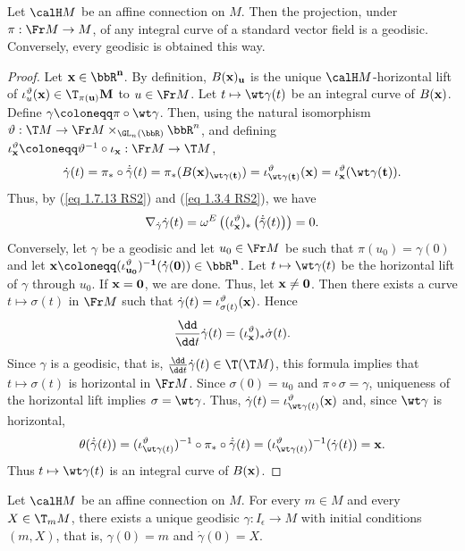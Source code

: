 \begin{prop}[{{\cite[Prop.~2.1.22]{RS2}}}]\label{prop 2.1.22 RS2}
    Let $\calH M$ be an affine connection on $M$. Then the projection, under $\pi:\Fr M\to M$, of any integral curve of a standard vector field is a geodisic. Conversely, every geodisic is obtained this way.
\end{prop}
\begin{proof}
    Let $\bf{x}\in\bbR^n$. By definition, $B(\bf{x})_u$ is the unique $\calH M$-horizontal lift of $\iota_u^\vartheta(\bf{x})\in \T_{\pi(u)}M$ to $u\in\Fr M$. Let $t\mapsto \wt\gamma(t)$ be an integral curve of $B(\bf{x})$. Define $\gamma\coloneqq \pi\circ\wt\gamma$. Then, using the natural isomorphism $\vartheta:\T M\to \Fr M\times_{\GL_n(\bbR)}\bbR^n$, and defining $\iota_{\bf{x}}^\vartheta\coloneqq \vartheta^{-1}\circ\iota_{\bf{x}}:\Fr M\to \T M$,
    \[\dot\gamma(t)=\pi_\ast\circ \dot{\tilde\gamma}(t)=\pi_\ast(B(\bf{x})_{\wt\gamma(t)})=\iota_{\wt\gamma(t)}^\vartheta(\bf{x})=\iota_{\bf{x}}^\vartheta(\wt\gamma(t)).\]
    Thus, by (\ref{eq 1.7.13 RS2}) and (\ref{eq 1.3.4 RS2}), we have 
    \[\nabla_{\dot\gamma}\dot\gamma(t)=\omega^E\left((\iota_{\bf{x}}^\vartheta)_\ast \left(\dot{\tilde\gamma}(t)\right)\right)=0.\]
    Conversely, let $\gamma$ be a geodisic and let $u_0\in\Fr M$ be such that $\pi(u_0)=\gamma(0)$ and let $\bf{x}\coloneqq (\iota_{u_0}^\vartheta)^{-1}(\dot\gamma(0))\in\bbR^n$. Let $t\mapsto \wt\gamma(t)$ be the horizontal lift of $\gamma$ through $u_0$. If $\bf{x}=0$, we are done. Thus, let $\bf{x}\neq 0$. Then there exists a curve $t\mapsto \sigma(t)$ in $\Fr M$ such that $\dot\gamma(t)=\iota_{\sigma(t)}^\vartheta(\bf{x})$. Hence 
    \[\frac{\dd}{\dd t}\dot\gamma(t)=(\iota^\vartheta_{\bf{x}})_\ast\dot\sigma(t).\] 
    Since $\gamma$ is a geodisic, that is, $\frac{\dd}{\dd t}\dot\gamma(t)\in \T(\T M)$, this formula implies that $t\mapsto \sigma(t)$ is horizontal in $\Fr M$. Since $\sigma(0)=u_0$ and $\pi\circ \sigma=\gamma$, uniqueness of the horizontal lift implies $\sigma=\wt\gamma$. Thus, $\dot\gamma(t)=\iota_{\wt\gamma(t)}^\vartheta(\bf{x})$ and, since $\wt\gamma$ is horizontal,
    \[\theta(\dot{\tilde\gamma}(t))=(\iota_{\wt\gamma(t)}^\vartheta)^{-1}\circ\pi_\ast\circ\dot{\tilde\gamma}(t)=
    (\iota_{\wt\gamma(t)}^\vartheta)^{-1}(\dot\gamma(t))=\bf{x}.\]
    Thus $t\mapsto \wt\gamma(t)$ is an integral curve of $B(\bf{x})$.
\end{proof}

\begin{cor}[{{\cite[Cor.~2.1.23]{RS2}}}]\label{cor 2.1.23 RS2}
    Let $\calH M$ be an affine connection on $M$. For every $m\in M$ and every $X\in \T_mM$, there exists a unique geodisic $\gamma:I_\epsilon\to M$ with initial conditions $(m,X)$, that is, $\gamma(0)=m$ and $\dot\gamma(0)=X$.
\end{cor}

